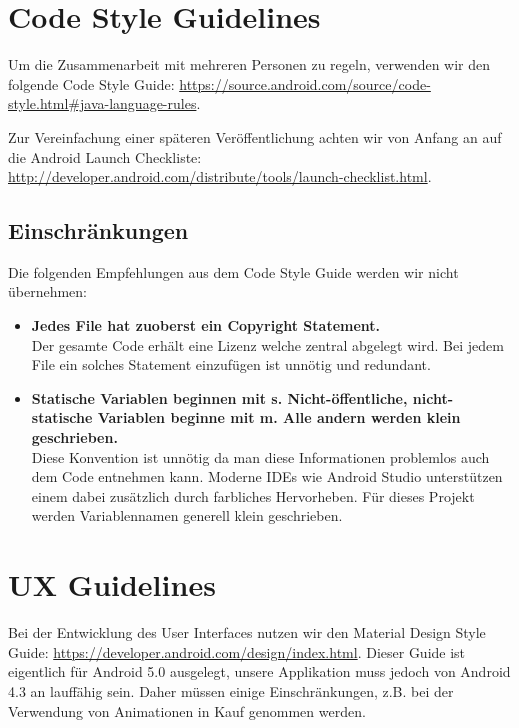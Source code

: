 \section{Code Style Guidelines}
\label{sec:Code Style Guidelines}

Um die Zusammenarbeit mit mehreren Personen zu regeln, verwenden wir den folgende Code Style Guide: \url{https://source.android.com/source/code-style.html#java-language-rules}.

Zur Vereinfachung einer späteren Veröffentlichung achten wir von Anfang an auf die Android Launch Checkliste:\\ \url{http://developer.android.com/distribute/tools/launch-checklist.html}.

\subsection{Einschränkungen}
Die folgenden Empfehlungen aus dem Code Style Guide werden wir nicht übernehmen:

\begin{itemize}
\item \textbf{Jedes File hat zuoberst ein Copyright Statement.} \\ Der gesamte Code erhält eine Lizenz welche zentral abgelegt wird. Bei jedem File ein solches Statement einzufügen ist unnötig und redundant.
\item \textbf{Statische Variablen beginnen mit s. Nicht-öffentliche, nicht-statische Variablen beginne mit m. Alle andern werden klein geschrieben.} \\ Diese Konvention ist unnötig da man diese Informationen problemlos auch dem Code entnehmen kann. Moderne IDEs wie Android Studio unterstützen einem dabei zusätzlich durch farbliches Hervorheben. Für dieses Projekt werden Variablennamen generell klein geschrieben.
\end{itemize}

\section{UX Guidelines}
\label{sec:UX Guidelines}

Bei der Entwicklung des User Interfaces nutzen wir den Material Design Style Guide:
\url{https://developer.android.com/design/index.html}. Dieser Guide ist eigentlich für Android 5.0 ausgelegt, unsere Applikation muss jedoch von Android 4.3 an lauffähig sein. Daher müssen einige Einschränkungen, z.B. bei der Verwendung von Animationen in Kauf genommen werden.
